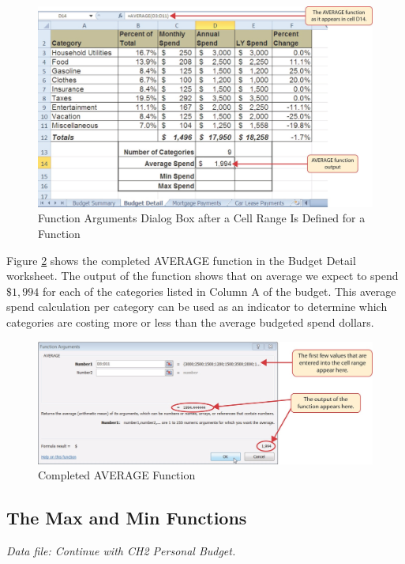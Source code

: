 \begin{figure}[H]
	\centering
	\includegraphics[width=\maxwidth{.95\linewidth}]{gfx/ch02_fig22}
	\caption{Function Arguments Dialog Box after a Cell Range Is Defined for a Function}
	\label{02:fig22}
\end{figure}

Figure \ref{02:fig23} shows the completed AVERAGE function in the Budget Detail worksheet. The output of the function shows that on average we expect to spend $ \$1,994 $ for each of the categories listed in Column A of the budget. This average spend calculation per category can be used as an indicator to determine which categories are costing more or less than the average budgeted spend dollars.

\begin{figure}[H]
	\centering
	\includegraphics[width=\maxwidth{.95\linewidth}]{gfx/ch02_fig23}
	\caption{Completed AVERAGE Function}
	\label{02:fig23}
\end{figure}

\subsection{The Max and Min Functions}

\textit{Data file: Continue with CH2 Personal Budget.}

